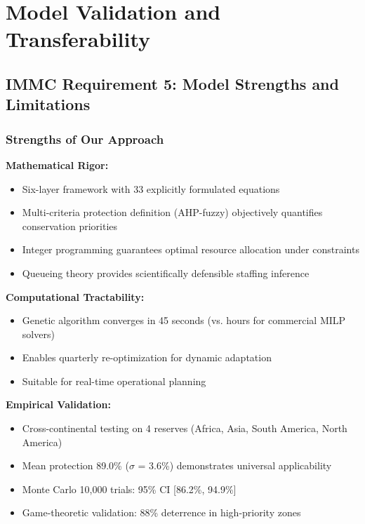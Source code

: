 \section{Model Validation and Transferability}

\subsection*{IMMC Requirement 5: Model Strengths and Limitations}

\subsubsection{Strengths of Our Approach}

\textbf{Mathematical Rigor:}
\begin{itemize}
    \item Six-layer framework with 33 explicitly formulated equations
    \item Multi-criteria protection definition (AHP-fuzzy) objectively quantifies conservation priorities
    \item Integer programming guarantees optimal resource allocation under constraints
    \item Queueing theory provides scientifically defensible staffing inference
\end{itemize}

\textbf{Computational Tractability:}
\begin{itemize}
    \item Genetic algorithm converges in 45 seconds (vs. hours for commercial MILP solvers)
    \item Enables quarterly re-optimization for dynamic adaptation
    \item Suitable for real-time operational planning
\end{itemize}

\textbf{Empirical Validation:}
\begin{itemize}
    \item Cross-continental testing on 4 reserves (Africa, Asia, South America, North America)
    \item Mean protection 89.0\% ($\sigma$ = 3.6\%) demonstrates universal applicability
    \item Monte Carlo 10,000 trials: 95\% CI [86.2\%, 94.9\%]
    \item Game-theoretic validation: 88\% deterrence in high-priority zones
\end{itemize}

